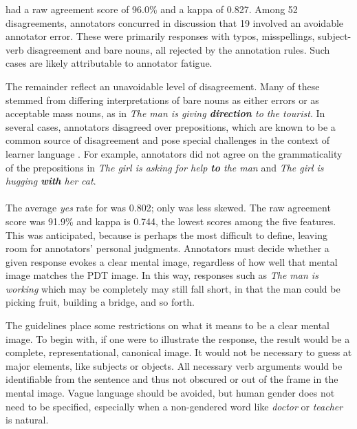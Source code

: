  had a raw agreement score of 96.0\% and a kappa of 0.827. Among 52 disagreements, annotators concurred in discussion that 19 involved an avoidable annotator error. These were primarily responses with typos, misspellings, subject-verb disagreement and bare nouns, all rejected by the annotation rules. Such cases are likely attributable to annotator fatigue.

The remainder reflect an unavoidable level of disagreement. Many of these stemmed from differing interpretations of bare nouns as either errors or as acceptable mass nouns, as in \textit{The man is giving \textbf{direction} to the tourist}. In several cases, annotators disagreed over prepositions, which are known to be a common source of disagreement and pose special challenges in the context of learner language \citep{tetreault-chodorow:2008:HJCL,tetreault:chodorow:08}. For example, annotators did not agree on the grammaticality of the prepositions in \textit{The girl is asking for help \textbf{to} the man} and \textit{The girl is hugging \textbf{with} her cat}. 

\paragraph{} The average \textit{yes} rate for  was 0.802; only  was less skewed.
%
The raw agreement score was 91.9\% and kappa is 0.744, the lowest scores among the five features. This was anticipated, because  is perhaps the most difficult to define, leaving room for annotators' personal judgments. Annotators must decide whether a given response evokes a clear mental image, regardless of how well that mental image matches the PDT image.  In this way, responses such as \textit{The man is working} which may %
be completely  may still fall short, in that the man could be picking fruit, building a bridge, and so forth.

The guidelines place some restrictions on what it means to be a clear mental image. To begin with, if one were to illustrate the response, the result would be a complete, representational, canonical image. It would not be necessary to guess at major elements, like subjects or objects. 
%
All necessary verb arguments would be identifiable from the sentence and thus not obscured or out of the frame in the mental image.
%
Vague language should be avoided, but human gender does not need to be specified, especially when a non-gendered word like \textit{doctor} or \textit{teacher} is natural. 

